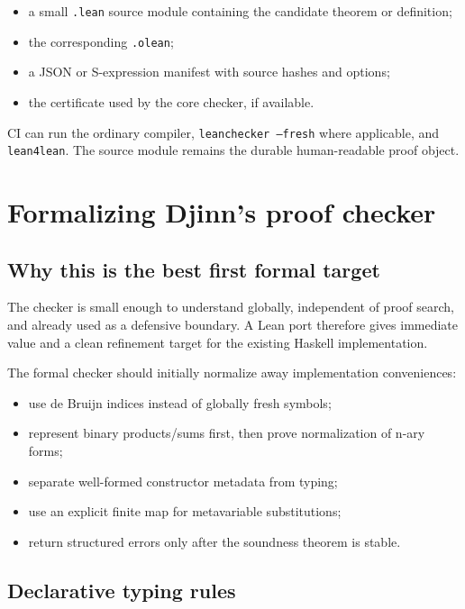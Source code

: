 \documentclass[11pt,letterpaper,openany]{report}
\theoremstyle{definition}
\theoremstyle{remark}
\newcommand{\code}[1]{\texttt{#1}}
\begin{document}
\begin{itemize}
\item a small \code{.lean} source module containing the candidate theorem or definition;
\item the corresponding \code{.olean};
\item a JSON or S-expression manifest with source hashes and options;
\item the certificate used by the core checker, if available.
\end{itemize}

CI can run the ordinary compiler, \code{leanchecker --fresh} where applicable, and \code{lean4lean}. The source module remains the durable human-readable proof object.

\section{Formalizing Djinn's proof checker}
\label{sec:djinn-checker}

\subsection{Why this is the best first formal target}

The checker is small enough to understand globally, independent of proof search, and already used as a defensive boundary. A Lean port therefore gives immediate value and a clean refinement target for the existing Haskell implementation.

The formal checker should initially normalize away implementation conveniences:

\begin{itemize}
\item use de Bruijn indices instead of globally fresh symbols;
\item represent binary products/sums first, then prove normalization of n-ary forms;
\item separate well-formed constructor metadata from typing;
\item use an explicit finite map for metavariable substitutions;
\item return structured errors only after the soundness theorem is stable.
\end{itemize}

\subsection{Declarative typing rules}
\end{document}
